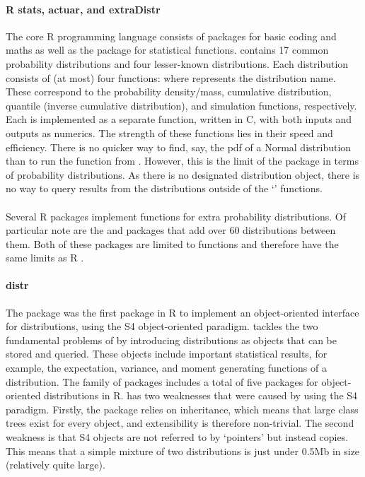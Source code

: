 \paragraph{R stats, actuar, and extraDistr}
The core R programming language consists of packages for basic coding and maths as well as the  package for statistical functions.  contains 17 common probability distributions and four lesser-known distributions. Each distribution consists of (at most) four functions:  where  represents the distribution name. These correspond to the probability density/mass, cumulative distribution, quantile (inverse cumulative distribution), and simulation functions, respectively. Each is implemented as a separate function, written in C, with both inputs and outputs as numerics. The strength of these functions lies in their speed and efficiency. There is no quicker way to find, say, the pdf of a Normal distribution than to run the  function from . However, this is the limit of the package in terms of probability distributions. As there is no designated distribution object, there is no way to query results from the distributions outside of the `' functions.
\\\\
Several R packages implement  functions for extra probability distributions. Of particular note are the  \citep{pkgextradistr} and  \citep{pkgactuar} packages that add over 60 distributions between them. Both of these packages are limited to  functions and therefore have the same limits as R .

\paragraph{distr}
The  package was the first package in R to implement an object-oriented interface for distributions, using the S4 object-oriented paradigm.  tackles the two fundamental problems of  by introducing distributions as objects that can be stored and queried. These objects include important statistical results, for example, the expectation, variance, and moment generating functions of a distribution. The  family of packages includes a total of five packages for object-oriented distributions in R.  has two weaknesses that were caused by using the S4 paradigm. Firstly, the package relies on inheritance, which means that large class trees exist for every object, and extensibility is therefore non-trivial. The second weakness is that S4 objects are not referred to by `pointers' but instead copies. This means that a simple mixture of two distributions is just under 0.5Mb in size (relatively quite large).

